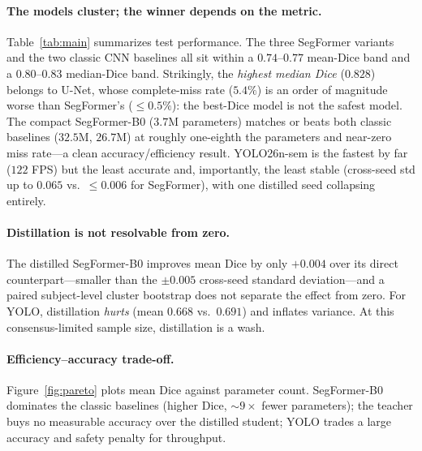 \documentclass[letterpaper,twocolumn,10pt]{article}
\begin{document}
\paragraph{The models cluster; the winner depends on the metric.}
Table~\ref{tab:main} summarizes test performance. The three SegFormer variants and
the two classic CNN baselines all sit within a $0.74$--$0.77$ mean-Dice band and a
$0.80$--$0.83$ median-Dice band. Strikingly, the \emph{highest median Dice}
($0.828$) belongs to U-Net, whose complete-miss rate ($5.4\%$) is an order of
magnitude worse than SegFormer's ($\leq 0.5\%$): the best-Dice model is not the
safest model. The compact SegFormer-B0 ($3.7$M parameters) matches or beats both
classic baselines ($32.5$M, $26.7$M) at roughly one-eighth the parameters and near-zero
miss rate---a clean accuracy/efficiency result. YOLO26n-sem is the fastest by far
($122$ FPS) but the least accurate and, importantly, the least stable
(cross-seed std up to $0.065$ vs.\ $\leq0.006$ for SegFormer), with one distilled
seed collapsing entirely.

\paragraph{Distillation is not resolvable from zero.}
The distilled SegFormer-B0 improves mean Dice by only $+0.004$ over its direct
counterpart---smaller than the $\pm0.005$ cross-seed standard deviation---and a
paired subject-level cluster bootstrap does not separate the effect from zero. For
YOLO, distillation \emph{hurts} (mean $0.668$ vs.\ $0.691$) and inflates variance.
At this consensus-limited sample size, distillation is a wash.

\paragraph{Efficiency--accuracy trade-off.}
Figure~\ref{fig:pareto} plots mean Dice against parameter count. SegFormer-B0
dominates the classic baselines (higher Dice, $\sim9\times$ fewer parameters); the
teacher buys no measurable accuracy over the distilled student; YOLO trades a
large accuracy and safety penalty for throughput.
\end{document}

